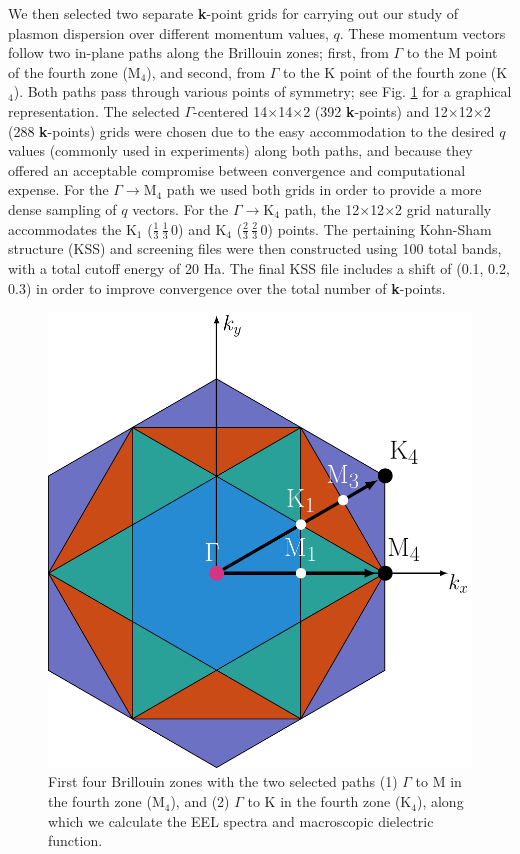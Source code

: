 \documentclass[aps,prb,10pt,showpacs,superscriptaddress,twocolumn,notitlepage]{revtex4-1}
\begin{document}
We then selected two separate \textbf{k}-point grids for carrying out our study
of plasmon dispersion over different momentum values, $q$. These momentum
vectors follow two in-plane paths along the Brillouin zones; first, from
$\Gamma$ to the M point of the fourth zone (M$_{4}$), and second, from $\Gamma$
to the K point of the fourth zone (K$_{4}$). Both paths pass through various
points of symmetry; see Fig. \ref{fig:brillouin} for a graphical representation.
The selected $\Gamma$-centered 14$\times$14$\times$2 (392 \textbf{k}-points) and
12$\times$12$\times$2 (288 \textbf{k}-points) grids were chosen due to the easy
accommodation to the desired $q$ values (commonly used in experiments) along
both paths, and because they offered an acceptable compromise between
convergence and computational expense. For the $\Gamma \rightarrow
\mathrm{M_{4}}$ path we used both grids in order to provide a more dense
sampling of $q$ vectors. For the $\Gamma \rightarrow \mathrm{K_{4}}$ path, the
12$\times$12$\times$2 grid naturally accommodates the K$_{1}$
($\frac{1}{3}\,\frac{1}{3}\,0$) and K$_{4}$ ($\frac{2}{3}\,\frac{2}{3}\,0$)
points. The pertaining Kohn-Sham structure (KSS) and screening files were then
constructed using 100 total bands, with a total cutoff energy of 20 Ha. The
final KSS file includes a shift of (0.1, 0.2, 0.3) in order to improve
convergence over the total number of \textbf{k}-points.

\begin{figure}[t]
\centering
\includegraphics[width=0.6\linewidth]{fig01}
\caption{First four Brillouin zones with the two selected paths
(1) $\Gamma$ to M in the fourth zone (M$_{4}$), and (2) $\Gamma$ to K in the
fourth zone (K$_{4}$), along which we calculate the EEL spectra and macroscopic
dielectric function.}
\label{fig:brillouin}
\end{figure}
\end{document}

